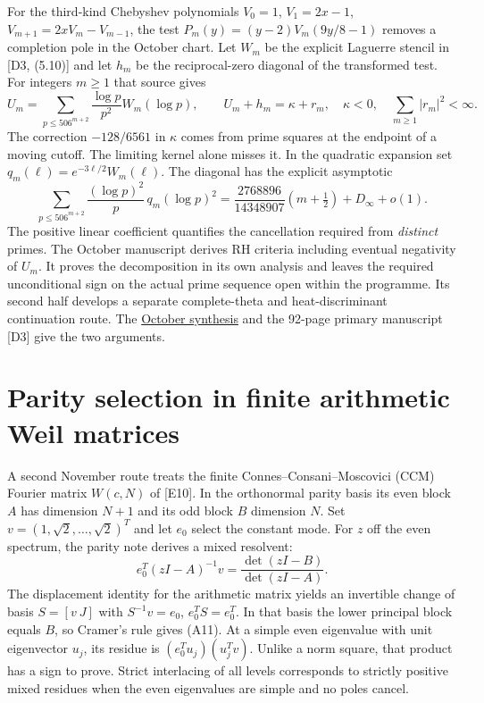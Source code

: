 \documentclass[
  10pt,
  a4paper,
  10pt,
  oneside,
  openany]{book}
\begin{document}
For the third-kind Chebyshev polynomials \(V_0=1\), \(V_1=2x-1\),
\(V_{m+1}=2xV_m-V_{m-1}\), the test \(P_m(y)=(y-2)V_m(9y/8-1)\) removes
a completion pole in the October chart. Let \(W_m\) be the explicit
Laguerre stencil in {[}D3, (5.10){]} and let \(h_m\) be the
reciprocal-zero diagonal of the transformed test. For integers \(m\ge1\)
that source gives \[
 U_m=\sum_{p\le506^{m+2}}\frac{\log p}{p^2}W_m(\log p),\qquad
 U_m+h_m=\kappa+r_m,\quad\kappa<0,\quad \sum_{m\ge1}|r_m|^2<\infty .
 \tag{A9}\label{eq:A9}
\] The correction \(-128/6561\) in \(\kappa\) comes from prime squares
at the endpoint of a moving cutoff. The limiting kernel alone misses it.
In the quadratic expansion set \(q_m(\ell)=e^{-3\ell/2}W_m(\ell)\). The
diagonal has the explicit asymptotic \[
 \sum_{p\le506^{m+2}}\frac{(\log p)^2}{p}\,q_m(\log p)^2
  =\frac{2768896}{14348907}\left(m+\tfrac12\right)+D_\infty+o(1).
 \tag{A10}\label{eq:A10}
\] The positive linear coefficient quantifies the cancellation required
from \emph{distinct} primes. The October manuscript derives RH criteria
including eventual negativity of \(U_m\). It proves the decomposition in
its own analysis and leaves the required unconditional sign on the
actual prime sequence open within the programme. Its second half
develops a separate complete-theta and heat-discriminant continuation
route. The
\hyperref[octobers-signed-prime-and-complete-theta-programme]{October
synthesis} and the 92-page primary manuscript {[}D3{]} give the two
arguments.

\section{Parity selection in finite arithmetic Weil
matrices}\label{atlas-parity}

A second November route treats the finite Connes--Consani--Moscovici
(CCM) Fourier matrix \(W(c,N)\) of {[}E10{]}. In the orthonormal parity
basis its even block \(A\) has dimension \(N+1\) and its odd block \(B\)
dimension \(N\). Set \(v=(1,\sqrt2,\ldots,\sqrt2)^T\) and let \(e_0\)
select the constant mode. For \(z\) off the even spectrum, the parity
note derives a mixed resolvent: \[
 e_0^T(zI-A)^{-1}v=\frac{\det(zI-B)}{\det(zI-A)}.
 \tag{A11}\label{eq:A11}
\] The displacement identity for the arithmetic matrix yields an
invertible change of basis \(S=[v\ J]\) with \(S^{-1}v=e_0\),
\(e_0^TS=e_0^T\). In that basis the lower principal block equals \(B\),
so Cramer's rule gives (A11). At a simple even eigenvalue with unit
eigenvector \(u_j\), its residue is \((e_0^Tu_j)(u_j^Tv)\). Unlike a
norm square, that product has a sign to prove. Strict interlacing of all
levels corresponds to strictly positive mixed residues when the even
eigenvalues are simple and no poles cancel.
\end{document}
